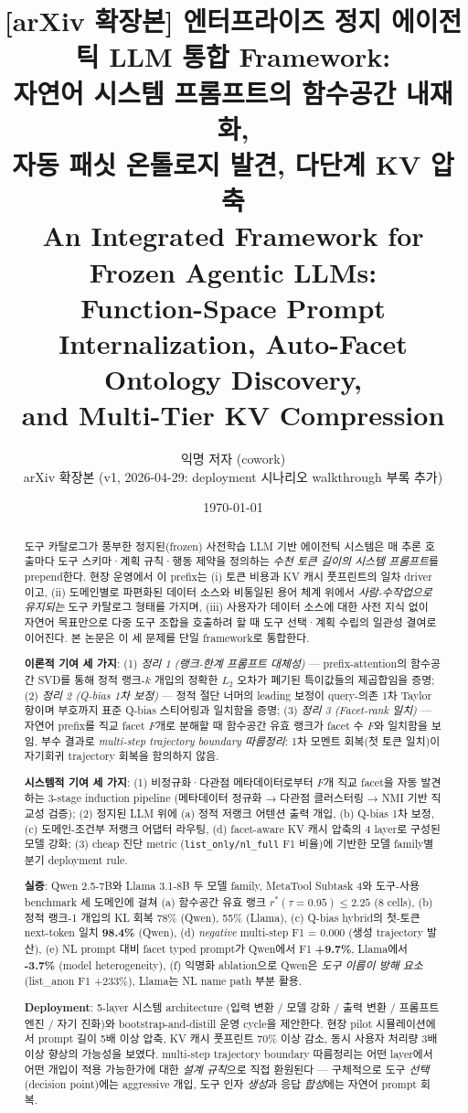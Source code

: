 \documentclass[11pt]{article}
\title{
  [arXiv 확장본] 엔터프라이즈 정지 에이전틱 LLM 통합 Framework:\\
  자연어 시스템 프롬프트의 함수공간 내재화,\\
  자동 패싯 온톨로지 발견, 다단계 KV 압축\\[4pt]
  \large An Integrated Framework for Frozen Agentic LLMs:\\
  Function-Space Prompt Internalization, Auto-Facet Ontology Discovery,\\
  and Multi-Tier KV Compression
}
\author{
  익명 저자 (cowork)\\
  arXiv 확장본 (v1, 2026-04-29: deployment 시나리오 walkthrough 부록 추가)
}
\date{\today}
\theoremstyle{definition}
\begin{document}
\maketitle

\begin{abstract}
\noindent
도구 카탈로그가 풍부한 정지된(frozen) 사전학습 LLM 기반 에이전틱 시스템은 매 추론 호출마다 도구 스키마·계획 규칙·행동 제약을 정의하는 \emph{수천 토큰 길이의 시스템 프롬프트}를 prepend한다. 현장 운영에서 이 prefix는 (i) 토큰 비용과 KV 캐시 풋프린트의 일차 driver이고, (ii) 도메인별로 파편화된 데이터 소스와 비통일된 용어 체계 위에서 \emph{사람-수작업으로 유지되는} 도구 카탈로그 형태를 가지며, (iii) 사용자가 데이터 소스에 대한 사전 지식 없이 자연어 목표만으로 다중 도구 조합을 호출하려 할 때 도구 선택·계획 수립의 일관성 결여로 이어진다. 본 논문은 이 세 문제를 단일 framework로 통합한다.

\textbf{이론적 기여 세 가지}: (1) \emph{정리 1 (랭크-한계 프롬프트 대체성)} ---  prefix-attention의 함수공간 SVD를 통해 정적 랭크-$k$ 개입의 정확한 $L_2$ 오차가 폐기된 특이값들의 제곱합임을 증명; (2) \emph{정리 2 (Q-bias 1차 보정)} --- 정적 절단 너머의 leading 보정이 query-의존 1차 Taylor 항이며 부호까지 표준 Q-bias 스티어링과 일치함을 증명; (3) \emph{정리 3 (Facet-rank 일치)} --- 자연어 prefix를 직교 facet $F$개로 분해할 때 함수공간 유효 랭크가 facet 수 $F$와 일치함을 보임. 부수 결과로 \emph{multi-step trajectory boundary 따름정리}: 1차 모멘트 회복(첫 토큰 일치)이 자기회귀 trajectory 회복을 함의하지 않음.

\textbf{시스템적 기여 세 가지}: (1) 비정규화·다관점 메타데이터로부터 $F$개 직교 facet을 자동 발견하는 3-stage induction pipeline (메타데이터 정규화 → 다관점 클러스터링 → NMI 기반 직교성 검증); (2) 정지된 LLM 위에 (a) 정적 저랭크 어텐션 출력 개입, (b) Q-bias 1차 보정, (c) 도메인-조건부 저랭크 어댑터 라우팅, (d) facet-aware KV 캐시 압축의 4 layer로 구성된 모델 강화; (3) cheap 진단 metric (\texttt{list\_only/nl\_full} F1 비율)에 기반한 모델 family별 분기 deployment rule.

\textbf{실증}: Qwen 2.5-7B와 Llama 3.1-8B 두 모델 family, MetaTool Subtask 4와 도구-사용 benchmark 세 도메인에 걸쳐 (a) 함수공간 유효 랭크 $r^*(\tau{=}0.95) \le 2.25$ (8 cells), (b) 정적 랭크-1 개입의 KL 회복 78\% (Qwen), 55\% (Llama), (c) Q-bias hybrid의 첫-토큰 next-token 일치 \textbf{98.4\%} (Qwen), (d) \emph{negative} multi-step F1 = 0.000 (생성 trajectory 발산), (e) NL prompt 대비 facet typed prompt가 Qwen에서 F1 \textbf{+9.7\%}, Llama에서 \textbf{-3.7\%} (model heterogeneity), (f) 익명화 ablation으로 Qwen은 \emph{도구 이름이 방해 요소} (list\_anon F1 +233\%), Llama는 NL name path 부분 활용.

\textbf{Deployment}: 5-layer 시스템 architecture (입력 변환 / 모델 강화 / 출력 변환 / 프롬프트 엔진 / 자기 진화)와 bootstrap-and-distill 운영 cycle을 제안한다. 현장 pilot 시뮬레이션에서 prompt 길이 5배 이상 압축, KV 캐시 풋프린트 70\% 이상 감소, 동시 사용자 처리량 3배 이상 향상의 가능성을 보였다. multi-step trajectory boundary 따름정리는 어떤 layer에서 어떤 개입이 적용 가능한가에 대한 \emph{설계 규칙}으로 직접 환원된다 --- 구체적으로 도구 \emph{선택} (decision point)에는 aggressive 개입, 도구 인자 \emph{생성}과 응답 \emph{합성}에는 자연어 prompt 회복.
\end{abstract}
\end{document}

